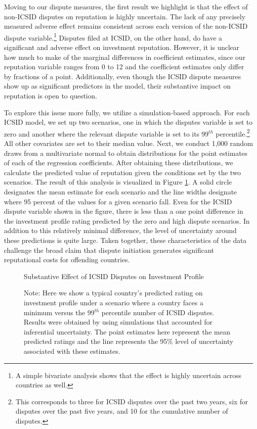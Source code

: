 \documentclass[12pt,onesided]{amsart}
\begin{document}
Moving to our dispute measures, the first result we highlight is that the effect of non-ICSID disputes on reputation is highly uncertain. The lack of any precisely measured adverse effect remains consistent across each version of the non-ICSID dispute variable.\footnote{A simple bivariate analysis shows that the effect is highly uncertain across countries as well.} Disputes filed at ICSID, on the other hand, do have a significant and adverse effect on investment reputation. However, it is unclear how much to make of the marginal differences in coefficient estimates, since our reputation variable ranges from 0 to 12 and the coefficient estimates only differ by fractions of a point. Additionally, even though the ICSID dispute measures show up as significant predictors in the model, their substantive impact on reputation is open to question. 

To explore this issue more fully, we utilize a simulation-based approach. For each ICSID model, we set up two scenarios, one in which the disputes variable is set to zero and another where the relevant dispute variable is set to its 99$^{th}$ percentile.\footnote{This corresponds to three for ICSID disputes over the past two years, six for disputes over the past five years, and 10 for the cumulative number of disputes.} All other covariates are set to their median value. Next, we conduct 1,000 random draws from a multivariate normal to obtain distributions for the point estimates of each of the regression coefficients. After obtaining these distributions, we calculate the predicted value of reputation given the conditions set by the two scenarios. The result of this analysis is visualized in Figure \ref{fig:subEffect}. A solid circle designates the mean estimate for each scenario and the line widths designate where 95 percent of the values for a given scenario fall. Even for the ICSID dispute variable shown in the figure, there is less than a one point difference in the investment profile rating predicted by the zero and high dispute scenarios. In addition to this relatively minimal difference, the level of uncertainty around these predictions is quite large. Taken together, these characteristics of the data challenge the broad claim that dispute initiation generates significant reputational costs for offending countries.

\begin{figure}[ht]
	\centering
	\caption{Substantive Effect of ICSID Disputes on Investment Profile}
	\label{fig:subEffect}
	\resizebox{1\textwidth}{!}{}
	\caption*{Note: Here we show a typical country's predicted rating on investment profile under a scenario where a country faces a minimum versus the 99$^{th}$ percentile number of ICSID disputes. Results were obtained by using simulations that accounted for inferential uncertainty. The point estimates here represent the mean predicted ratings and the line represents the 95\% level of uncertainty associated with these estimates.}
\end{figure}
\FloatBarrier
\end{document}
